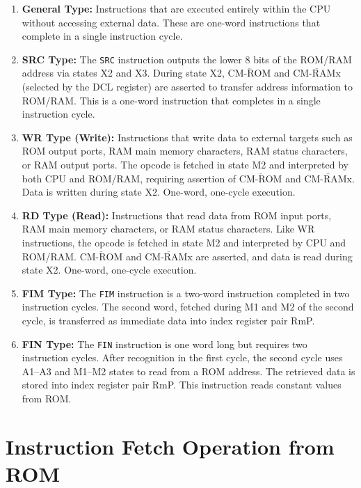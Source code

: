 \begin{enumerate}
  \item \textbf{General Type:}  
  Instructions that are executed entirely within the CPU without accessing external data. These are one-word instructions that complete in a single instruction cycle.

  \item \textbf{SRC Type:}  
  The \texttt{SRC} instruction outputs the lower 8 bits of the ROM/RAM address via states X2 and X3. During state X2, $\overline{\text{CM-ROM}}$ and $\overline{\text{CM-RAMx}}$ (selected by the DCL register) are asserted to transfer address information to ROM/RAM. This is a one-word instruction that completes in a single instruction cycle.

  \item \textbf{WR Type (Write):}  
  Instructions that write data to external targets such as ROM output ports, RAM main memory characters, RAM status characters, or RAM output ports. The opcode is fetched in state M2 and interpreted by both CPU and ROM/RAM, requiring assertion of $\overline{\text{CM-ROM}}$ and $\overline{\text{CM-RAMx}}$. Data is written during state X2. One-word, one-cycle execution.

  \item \textbf{RD Type (Read):}  
  Instructions that read data from ROM input ports, RAM main memory characters, or RAM status characters. Like WR instructions, the opcode is fetched in state M2 and interpreted by CPU and ROM/RAM. $\overline{\text{CM-ROM}}$ and $\overline{\text{CM-RAMx}}$ are asserted, and data is read during state X2. One-word, one-cycle execution.

  \item \textbf{FIM Type:}  
  The \texttt{FIM} instruction is a two-word instruction completed in two instruction cycles. The second word, fetched during M1 and M2 of the second cycle, is transferred as immediate data into index register pair RmP.

  \item \textbf{FIN Type:}  
  The \texttt{FIN} instruction is one word long but requires two instruction cycles. After recognition in the first cycle, the second cycle uses A1–A3 and M1–M2 states to read from a ROM address. The retrieved data is stored into index register pair RmP. This instruction reads constant values from ROM.
\end{enumerate}

\section{Instruction Fetch Operation from ROM}

